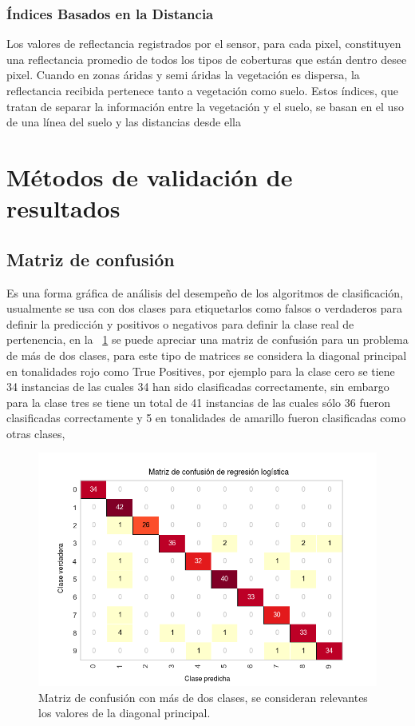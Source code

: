 \subsubsection{Índices Basados en la Distancia}
Los valores de reflectancia registrados por el sensor, para cada pixel, constituyen una reflectancia promedio de todos los tipos de coberturas que están dentro desee pixel. Cuando en  zonas áridas y semi áridas la vegetación es dispersa, la reflectancia recibida pertenece tanto a vegetación como suelo. Estos índices, que tratan de separar la información entre la vegetación y el suelo, se basan en el uso de una línea del suelo y las distancias desde ella


\section{Métodos de validación de resultados}
\subsection{Matriz de confusión}
Es una forma gráfica de análisis del desempeño de los algoritmos de clasificación, usualmente se usa con dos clases para etiquetarlos como falsos o verdaderos para definir la predicción y positivos o negativos para definir la clase real de pertenencia, en la \figurename~\ref{figure:confusionmatrix} se puede apreciar una matriz de confusión para un problema de más de dos clases, para este tipo de matrices se considera la diagonal principal en tonalidades rojo como True Positives, por ejemplo para la clase cero se tiene 34 instancias de las cuales 34 han sido clasificadas correctamente, sin embargo para la clase tres se tiene un total de 41 instancias de las cuales sólo 36 fueron clasificadas correctamente y 5 en tonalidades de amarillo fueron clasificadas como otras clases, \begin{figure}[h]
	\centering
	\includegraphics[width=\textwidth]{images/02theory/confusionMatrixEspa.png}
	\caption{Matriz de confusión con más de dos clases, se consideran relevantes los valores de la diagonal principal.}
	\label{figure:confusionmatrix}
\end{figure}


